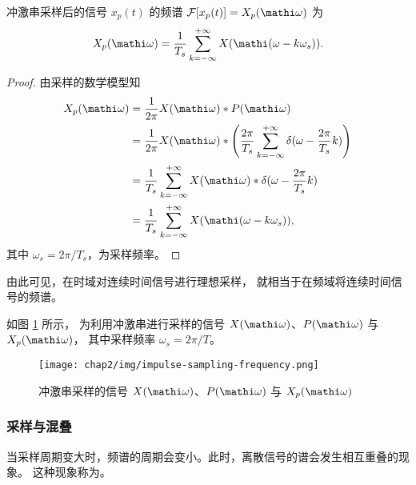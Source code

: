 \begin{property}
    冲激串采样后的信号 $x_p(t)$ 的频谱 $\mathcal{F}[x_p(t)] = X_p(\mathi \omega)$ 为
    \begin{align*}
        X_p(\mathi \omega) = \frac{1}{T_s}\sum_{k = -\infty}^{+\infty}X(\mathi(\omega - k\omega_s)).
    \end{align*}
    \label{property:impulse-sampling-frequency-2}
\end{property}

\begin{proof}
    由采样的数学模型知
    \begin{align*}
        X_p(\mathi \omega) & = \frac{1}{2\pi}X(\mathi \omega) * P(\mathi \omega) \\
        & = \frac{1}{2\pi}X(\mathi \omega) * \left(\frac{2\pi}{T_s}\sum_{k = -\infty}^{+\infty}\delta(\omega - \frac{2\pi}{T_s}k)\right) \\
        & = \frac{1}{T_s}\sum_{k = -\infty}^{+\infty}X(\mathi \omega) * \delta(\omega - \frac{2\pi}{T_s}k) \\
        & = \frac{1}{T_s}\sum_{k = -\infty}^{+\infty}X(\mathi(\omega - k\omega_s)),
    \end{align*}
    其中 $\omega_s = 2\pi/T_s$，为采样频率。
\end{proof}

\begin{remark}
    由此可见，在时域对连续时间信号进行理想采样，
    就相当于在频域将连续时间信号的频谱。
\end{remark}

\begin{example}
    如图 \ref{fig:impulse-sampling-frequency} 所示，
    为利用冲激串进行采样的信号 $X(\mathi \omega)$、$P(\mathi \omega)$ 与 $X_p(\mathi \omega)$，
    其中采样频率 $\omega_s = 2\pi/T$。
    \begin{figure}[H]
        \centering
        \texttt{[image: chap2/img/impulse-sampling-frequency.png]}
        \caption{冲激串采样的信号 $X(\mathi \omega)$、$P(\mathi \omega)$ 与 $X_p(\mathi \omega)$}
        \label{fig:impulse-sampling-frequency}
    \end{figure}
\end{example}

\subsubsection{采样与混叠}

\begin{definition}[混叠]
    当采样周期变大时，频谱的周期会变小。此时，离散信号的谱会发生相互重叠的现象。
    这种现象称为。
\end{definition}

